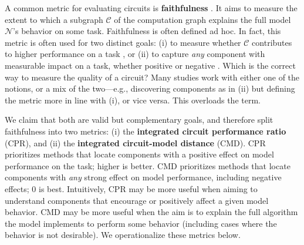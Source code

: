 \documentclass{article}
\theoremstyle{plain}
\theoremstyle{definition}
\theoremstyle{remark}
\newcommand{\arxiv}[1]{#1}
\begin{document}
A common metric for evaluating circuits is \textbf{faithfulness} \citep{wang2022interpretability, miller2024transformer}.
It aims to measure the extent to which a subgraph $\mathcal{C}$ of the computation graph explains the full model $\mathcal{N}$'s behavior on some task.
Faithfulness is often defined ad hoc. In fact, this metric is often used for two distinct goals:
(i) to measure whether $\mathcal{C}$ contributes to higher performance on a task \citep[e.g.,][]{meng2022locating,stolfo2023mechanistic,nikankin2025arithmetic}, or
(ii) to capture \emph{any} component with measurable impact on a task, whether positive or negative \citep[e.g.,][]{wang2022interpretability,hanna2024have,marks2024sparsefeaturecircuitsdiscovering}.
Which is the correct way to measure the quality of a circuit?
Many studies work with either one of the notions, or a mix of the two---e.g., discovering components as in (ii) but defining the metric more in line with (i), or vice versa. This overloads the term.

We claim that both are valid but complementary goals,
and therefore split faithfulness into two metrics: (i) the \arxiv{\textbf{integrated circuit performance ratio} (\textsf{CPR}), and (ii) the \textbf{integrated circuit-model distance} (\textsf{CMD})}. \textsf{CPR} prioritizes methods that locate components with a positive effect on model performance on the task; higher is better. \textsf{CMD} prioritizes methods that locate components with \emph{any} strong effect on model performance, including negative effects; 0 is best. Intuitively, \arxiv{\textsf{CPR} may be more useful when aiming to understand components that encourage or positively affect a given model behavior. \textsf{CMD} may be more useful when the aim is to explain the full algorithm the model implements to perform some behavior (including cases where the behavior is not desirable).} We operationalize these metrics below.
\end{document}
